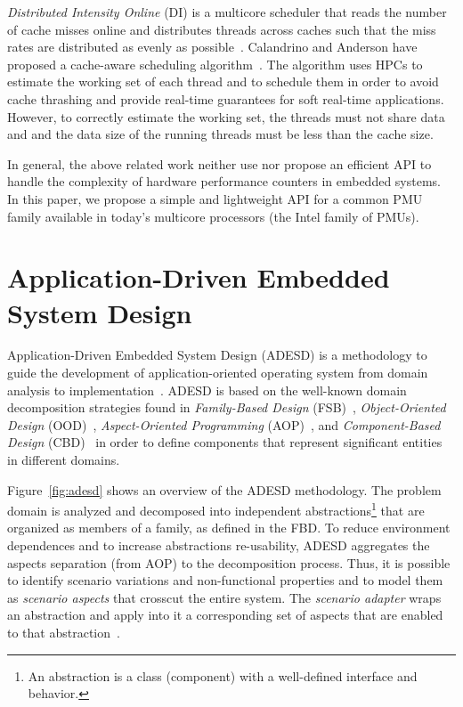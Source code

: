 \documentclass[conference]{IEEEtran}
\begin{document}
\textit{Distributed Intensity Online} (DI) is a multicore scheduler that reads the number of cache misses online and distributes threads across caches such that the miss rates are distributed as evenly as possible~\cite{Zhuravlev:2010}. Calandrino and Anderson have proposed a cache-aware scheduling algorithm~\cite{Calandrino:2009}. The algorithm uses HPCs to estimate the working set of each thread and to schedule them in order to avoid cache thrashing and provide real-time guarantees for soft real-time applications. However, to correctly estimate the working set, the threads must not share data and and the data size of the running threads must be less than the cache size.

In general, the above related work neither use nor propose an efficient API to handle the complexity of hardware performance counters in embedded systems. In this paper, we propose a simple and lightweight API for a common PMU family available in today's multicore processors (the Intel family of PMUs).

\section{Application-Driven Embedded System Design}
\label{sec:adesd}

Application-Driven Embedded System Design (ADESD) is a methodology to guide the development of application-oriented operating system from domain analysis to implementation~\cite{Froehlich:2001}. ADESD is based on the well-known domain decomposition strategies found in \textit{Family-Based Design} (FSB)~\cite{Parnas:1976}, \textit{Object-Oriented Design} (OOD)~\cite{Booch:2004}, \textit{Aspect-Oriented Programming} (AOP)~\cite{Kiczales:97}, and \textit{Component-Based Design} (CBD)~\cite{Vincentelli:2001} in order to define components that represent significant entities in different domains. 

Figure~\ref{fig:adesd} shows an overview of the ADESD methodology. The problem domain is analyzed and decomposed into independent abstractions\footnote{An abstraction is a class (component) with a well-defined interface and behavior.} that are organized as members of a family, as defined in the FBD. To reduce environment dependences and to increase abstractions re-usability, ADESD aggregates the aspects separation (from AOP) to the decomposition process. Thus, it is possible to identify scenario variations and non-functional properties and to model them as \textit{scenario aspects} that crosscut the entire system. The \textit{scenario adapter} wraps an abstraction and apply into it a corresponding set of aspects that are enabled to that abstraction~\cite{Frohlich:SCI:2000}.
\end{document}
